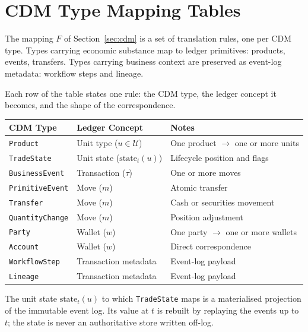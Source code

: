 \section{CDM Type Mapping Tables}
\label{app:cdm-mapping}

The mapping $F$ of Section~\ref{sec:cdm} is a set of translation rules, one per CDM type. Types carrying economic substance map to ledger primitives: products, events, transfers. Types carrying business context are preserved as event-log metadata: workflow steps and lineage.

Each row of the table states one rule: the CDM type, the ledger concept it becomes, and the shape of the correspondence.

\begin{center}
\begin{tabular}{l l l}
\toprule
\textbf{CDM Type} & \textbf{Ledger Concept} & \textbf{Notes} \\
\midrule
\texttt{Product} & Unit type ($u \in \mathcal{U}$) & One product $\to$ one or more units \\
\texttt{TradeState} & Unit state ($\text{state}_t(u)$) & Lifecycle position and flags \\
\texttt{BusinessEvent} & Transaction ($\tau$) & One or more moves \\
\texttt{PrimitiveEvent} & Move ($m$) & Atomic transfer \\
\texttt{Transfer} & Move ($m$) & Cash or securities movement \\
\texttt{QuantityChange} & Move ($m$) & Position adjustment \\
\texttt{Party} & Wallet ($w$) & One party $\to$ one or more wallets \\
\texttt{Account} & Wallet ($w$) & Direct correspondence \\
\texttt{WorkflowStep} & Transaction metadata & Event-log payload \\
\texttt{Lineage} & Transaction metadata & Event-log payload \\
\bottomrule
\end{tabular}
\end{center}

The unit state $\text{state}_t(u)$ to which \texttt{TradeState} maps is a materialised projection of the immutable event log. Its value at $t$ is rebuilt by replaying the events up to $t$; the state is never an authoritative store written off-log.

